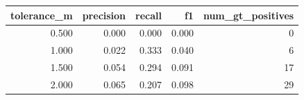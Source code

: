 \begin{tabular}{rrrrr}
\toprule
tolerance\_m & precision & recall & f1 & num\_gt\_positives \\
\midrule
0.500 & 0.000 & 0.000 & 0.000 & 0 \\
1.000 & 0.022 & 0.333 & 0.040 & 6 \\
1.500 & 0.054 & 0.294 & 0.091 & 17 \\
2.000 & 0.065 & 0.207 & 0.098 & 29 \\
\bottomrule
\end{tabular}
